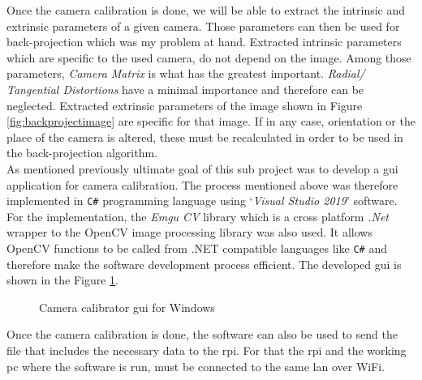 \documentclass[a4paper,12pt]{report}%
\begin{document}
Once the camera calibration is done, we will be able to extract the intrinsic and extrinsic parameters of a given camera. Those parameters can then be used for back-projection which was my problem at hand. Extracted intrinsic parameters which are specific to the  used  camera, do not depend on the image. Among those parameters, \textit{Camera Matrix} is what has the greatest important. \textit{Radial/ Tangential Distortions} have a minimal importance and therefore can be neglected. Extracted extrinsic parameters of the image shown in Figure \ref{fig:backprojectimage}  are specific for that image. If in any case, orientation or the place of the camera is altered, these must be recalculated in order to be used in the back-projection algorithm.\\
	
	
As mentioned previously ultimate goal of this sub project was to develop a \ac{gui} application for camera calibration. The process mentioned above was therefore implemented in {\tt C\#} programming language using `\textit{Visual Studio 2019}' software. For the implementation, the \textit{Emgu CV} library which is a cross platform \textit{.Net} wrapper to the OpenCV image processing library was also used. It allows OpenCV functions to be called from .NET compatible languages like {\tt C\#} and therefore make the software development process efficient. The developed \ac{gui} is shown in the Figure \ref{fig:calibgui}.

\begin{figure}[h]
	\centering
	\caption{Camera calibrator \ac{gui} for Windows}
	\label{fig:calibgui}
\end{figure}

Once the camera calibration is done, the software can also be used to send the file that includes the necessary data to the \ac{rpi}. For that the \ac{rpi} and the working \ac{pc} where the software is run,  must be connected to the same \ac{lan} over WiFi.
\end{document}
